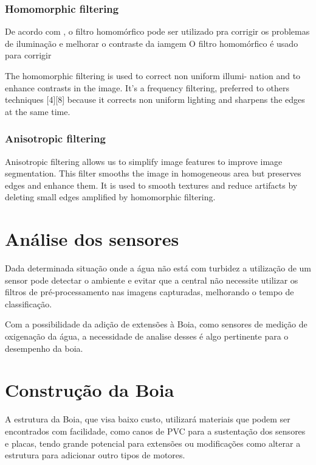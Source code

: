 \subsubsection{Homomorphic filtering}
De acordo com , o filtro homomórfico pode ser utilizado pra corrigir os problemas de iluminação e melhorar o contraste da iamgem
O filtro homomórfico é usado para corrigir

The homomorphic filtering is used to correct non uniform illumi- nation and to enhance contrasts in the image. It’s a frequency filtering, preferred to others techniques [4][8] because it corrects non uniform lighting and sharpens the edges at the same time.


\subsubsection{Anisotropic filtering}

 Anisotropic filtering allows us to simplify image features to improve image segmentation. This filter smooths the image in homogeneous area but preserves edges and enhance them. It is used to smooth textures and reduce artifacts by deleting small edges amplified by homomorphic filtering.


\section{Análise dos sensores}

 Dada determinada situação onde a água não está com turbidez a utilização de um sensor pode detectar o ambiente e evitar que a central não necessite utilizar os filtros de pré-processamento nas imagens capturadas, melhorando o tempo de classificação.

Com a possibilidade da adição de extensões à Boia, como sensores de medição de oxigenação da água, a necessidade de analise desses é algo pertinente para o desempenho da boia.



\section{Construção da Boia}

A estrutura da Boia, que visa baixo custo, utilizará materiais que podem ser encontrados com facilidade, como canos de PVC para a sustentação dos sensores e placas, tendo grande potencial para extensões ou modificações como alterar a estrutura para adicionar outro tipos de motores.


